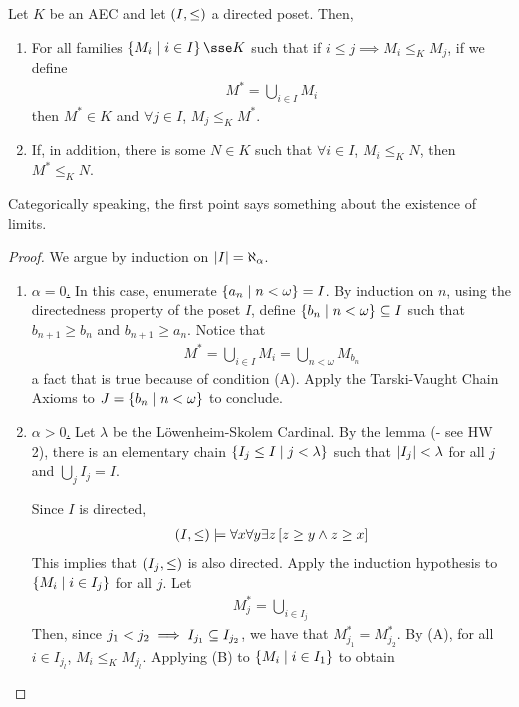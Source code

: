 \begin{boxtheorem}
    Let $K$ be an AEC and let $\left( I, \leq \right)$ a directed poset. Then,
    \begin{enumerate}[label = (\Alph*)]
        \item For all families $\setst{M_i}{i \in I} \sse K$ such that if $i \leq j \implies M_i \leq_K M_j$, if we define
        \begin{align*}
            M^* = \bigcup_{i \in I} M_i
        \end{align*}
        then $M^* \in K$ and $\forall j \in I$, $M_j \leq_K M^*$.

        \item If, in addition, there is some $N \in K$ such that $\forall i \in I$, $M_i \leq_K N$, then $M^* \leq_K N$.
    \end{enumerate}
    Categorically speaking, the first point says something about the existence of limits.
\end{boxtheorem}
\begin{proof}
    We argue by induction on $\left\lvert I \right\rvert = \aleph_{\alpha}$.

    \begin{enumerate}
        \item \underline{$\alpha = 0$.} In this case, enumerate $\left\{ a_n \; \middle\vert \; n < \omega \right\} = I$. By induction on $n$, using the directedness property of the poset $I$, define $\left\{ b_n \; \middle\vert \; n < \omega \right\} \subseteq I$ such that $b_{n+1} \geq b_n$ and $b_{n+1} \geq a_n$. Notice that
        \begin{align*}
            M^* = \bigcup_{i \in I} M_i = \bigcup_{n < \omega} M_{b_n}
        \end{align*}
        a fact that is true because of condition (A). Apply the Tarski-Vaught Chain Axioms to $J = \left\{ b_n \; \middle\vert \; n < \omega \right\}$ to conclude. %

        \item \underline{$\alpha > 0$.} Let $\lambda$ be the Löwenheim-Skolem Cardinal. By the lemma (\sorry - see HW 2), there is an elementary chain $\left\{ I_j \leq I \; \middle\vert \; j < \lambda \right\}$ such that $\left\lvert I_j \right\rvert < \lambda$ for all $j$ and $\bigcup_{j} I_j = I$.
        
        Since $I$ is directed,
        \begin{align*}
            \left( I, \leq \right) \models \forall x \forall y \exists z \left[ z \geq y \land z \geq x \right]
        \end{align*}
        This implies that $\left( I_j, \leq \right)$ is also directed. Apply the induction hypothesis to $\left\{ M_i \; \middle\vert \; i \in I_j \right\}$ for all $j$. Let
        \begin{align*}
            M_j^* = \bigcup_{i \in I_j}
        \end{align*}
        Then, since $j_1 < j_2 \implies I_{j_1} \subseteq I_{j_2}$, we have that $M_{j_1}^* = M_{j_2}^*$. By (A), for all $i \in I_{j_l}$, $M_i \leq_K M_{j_l}$. Applying (B) to $\left\{ M_i \; \middle\vert \; i \in I_1 \right\}$ to obtain \sorry
    \end{enumerate}
\end{proof}

